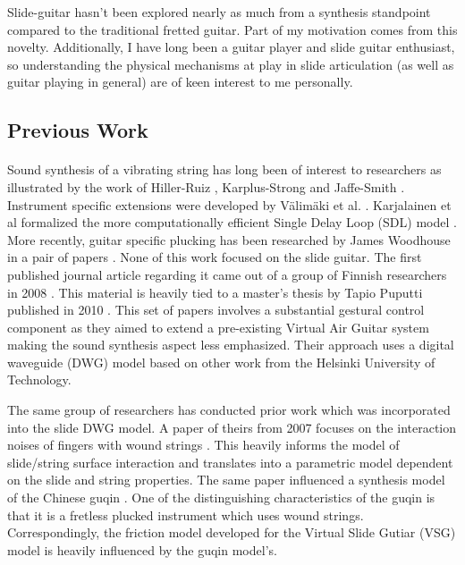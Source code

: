 \documentclass[12pt]{article}
\begin{document}
Slide-guitar hasn’t been explored nearly as much from a synthesis standpoint compared to the traditional fretted guitar. Part of my motivation comes from this novelty. Additionally, I have long been a guitar player and slide guitar enthusiast, so understanding the physical mechanisms at play in slide articulation (as well as guitar playing in general) are of keen interest to me personally.

\subsection*{Previous Work}
\paragraph{}
Sound synthesis of a vibrating string has long been of interest to researchers as illustrated by the work of Hiller-Ruiz \cite{hiller_synthesizing_1971} \cite{hiller_synthesizing_1971-1}, Karplus-Strong \cite{karplus_digital_1983} and Jaffe-Smith \cite{jaffe_extensions_1983}. Instrument specific extensions were developed by Välimäki et al. \cite{vaelimaeki_physical_1996-1}.  Karjalainen et al formalized the more computationally efficient Single Delay Loop (SDL) model \cite{karjalainen_plucked-string_1998}. More recently, guitar specific plucking has been researched by James Woodhouse in a pair of papers \cite{woodhouse_synthesis_2004} \cite{woodhouse_plucked_2004}. None of this work focused on the slide guitar. The first published journal article regarding it came out of a group of Finnish researchers in 2008 \cite{pakarinen_virtual_2008}. This material is heavily tied to a master’s thesis by Tapio Puputti published in 2010 \cite{puputti_real-time_2012}. This set of papers involves a substantial gestural control component as they aimed to extend a pre-existing Virtual Air Guitar system making the sound synthesis aspect less emphasized. Their approach uses a digital waveguide (DWG) model based on other work from the Helsinki University of Technology.

The same group of researchers has conducted prior work which was incorporated into the slide DWG model. A paper of theirs from 2007 focuses on the interaction noises of fingers with wound strings \cite{pakarinen_analysis_2007}. This heavily informs the model of slide/string surface interaction and translates into a parametric model dependent on the slide and string properties. The same paper influenced a synthesis model of the Chinese guqin \cite{penttinen_model-based_2006}. One of the distinguishing characteristics of the guqin is that it is a fretless plucked instrument which uses wound strings. Correspondingly, the friction model developed for the Virtual Slide Gutiar (VSG) model is heavily influenced by the guqin model's.
\end{document}
